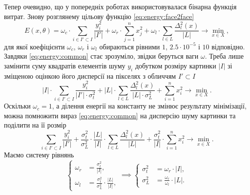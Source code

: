 Тепер очевидно,
що у попередніх роботах використовувалася бінарна функція витрат.
Знову розглянему цільову функцію \eqref{eq:energy:face2face}
\begin{equation*}
  E\left( x, \theta \right)
  = \omega_c \cdot \sum_{i \in I' \subset I} \frac{y_i^2}{\left| I' \right|}
  + \omega_r \cdot \sum_{j = 1}^{n} x_j^2
  + \omega_l \cdot \sum_{l \in L} \frac{\Delta_l^2\left( x \right)}
                                       {\left| L \right|}
  \to \min\limits_{x \in X},
\end{equation*}
для якої коефіцієнти $\omega_c$, $\omega_r$ і $\omega_l$
обираються рівними $1$, $2.5 \cdot 10^{-5}$ і $10$ відповідно.
Завдяки \eqref{eq:energy:common} стає зрозуміло,
звідки беруться ваги $\omega$.
Треба лише замінити суму квадратів елементів шуму $y_i$
добутком розміру картинки $\left| I \right|$ зі
зміщеною оцінкою його дисперсії на пікселях з обличчям $I' \subset I$
\begin{equation*}
  \left| I \right| \cdot
    \sum_{i \in I' \subset I} \frac{y_i^2}{\left| I' \right| \cdot \sigma^2_t}
  + \left| L \right| \cdot
    \sum_{l \in L} \frac{\Delta_l^2\left( x \right)}
                        {\left| L \right| \cdot \sigma_L^2}
  + \sum_{i = 1}^n x_i^2
  \to \min\limits_{x \in X}.
\end{equation*}
Оскільки $\omega_c = 1$,
а ділення енергії на константу не змінює результату мінімізації,
можна помножити вираз \eqref{eq:energy:common}
на дисперсію шуму картинки та поділити на її розмір
\begin{equation*}
  \sum_{i \in I' \subset I} \frac{y_i^2}{\left| I' \right|}
  + \frac{\sigma^2_t}{\sigma_L^2} \cdot \frac{\left| L \right|}{\left| I \right|}
    \cdot \sum_{l \in L} \frac{\Delta_l^2\left( x \right)}{\left| L \right|}
  + \frac{\sigma^2_t}{\left| I \right|} \cdot \sum_{i = 1}^n x_i^2
  \to \min\limits_{x \in X}.
\end{equation*}
Маємо систему рівнянь
\begin{equation*}
  \begin{cases}
    \omega_r &= \frac{\sigma^2_t}{\left| I \right|}, \\
    \omega_l &= \frac{\sigma^2_t}{\sigma_L^2}
                \cdot \frac{\left| L \right|}{\left| I \right|},
  \end{cases}
  \implies
  \begin{cases}
    \sigma^2_t &= \omega_r \cdot \left| I \right|, \\
    \sigma_L^2 &= \frac{\omega_r}{\omega_l} \cdot \left| L \right|.
  \end{cases}
\end{equation*}

